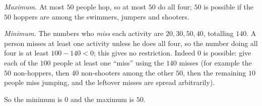 \emph{Maximum.} At most $50$ people hop, so at most $50$ do all four; $50$ is possible if the $50$ hoppers are among the swimmers, jumpers and shooters.

\emph{Minimum.} The numbers who \emph{miss} each activity are $20,30,50,40$, totalling $140$. A person misses at least one activity unless he does all four, so the number doing all four is at least $100-140<0$; this gives no restriction. Indeed $0$ is possible: give each of the $100$ people at least one ``miss'' using the $140$ misses (for example the $50$ non-hoppers, then $40$ non-shooters among the other $50$, then the remaining $10$ people miss jumping, and the leftover misses are spread arbitrarily).

So the minimum is $\boxed{0}$ and the maximum is $\boxed{50}$.
